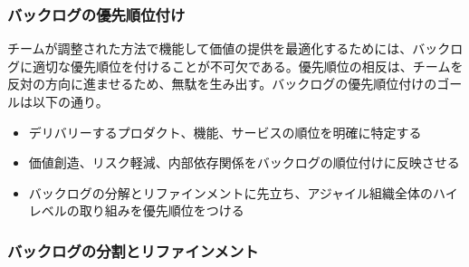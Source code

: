 \documentclass[12pt,a4paper,parskip=full]{scrartcl}
\begin{document}

\subsubsection{バックログの優先順位付け}\label{backlog-prioritization}

チームが調整された方法で機能して価値の提供を最適化するためには、バックログに適切な優先順位を付けることが不可欠である。優先順位の相反は、チームを反対の方向に進ませるため、無駄を生み出す。バックログの優先順位付けのゴールは以下の通り。

\begin{itemize}
\itemsep1pt\parskip0pt

\item
デリバリーするプロダクト、機能、サービスの順位を明確に特定する
\item
価値創造、リスク軽減、内部依存関係をバックログの順位付けに反映させる
\item
バックログの分解とリファインメントに先立ち、アジャイル組織全体のハイレベルの取り組みを優先順位をつける
\end{itemize}

\subsubsection{バックログの分割とリファインメント}\label{backlog-decomposition-and-refinement}
\end{document}

